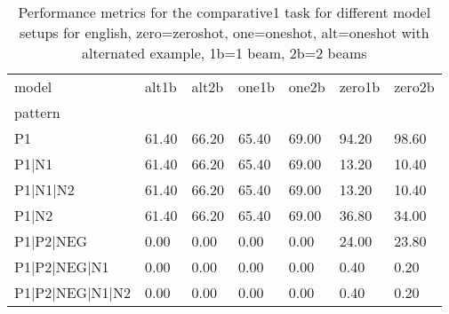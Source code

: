 \begin{table}[h]
\begin{tabular}{l|llllll}
\toprule
model & alt1b & alt2b & one1b & one2b & zero1b & zero2b \\
pattern &  &  &  &  &  &  \\
\midrule
P1 & 61.40 & 66.20 & 65.40 & 69.00 & 94.20 & 98.60 \\
P1|N1 & 61.40 & 66.20 & 65.40 & 69.00 & 13.20 & 10.40 \\
P1|N1|N2 & 61.40 & 66.20 & 65.40 & 69.00 & 13.20 & 10.40 \\
P1|N2 & 61.40 & 66.20 & 65.40 & 69.00 & 36.80 & 34.00 \\
P1|P2|NEG & 0.00 & 0.00 & 0.00 & 0.00 & 24.00 & 23.80 \\
P1|P2|NEG|N1 & 0.00 & 0.00 & 0.00 & 0.00 & 0.40 & 0.20 \\
P1|P2|NEG|N1|N2 & 0.00 & 0.00 & 0.00 & 0.00 & 0.40 & 0.20 \\
\bottomrule
\end{tabular}
\caption{Performance metrics for the comparative1 task for different model setups for english, zero=zeroshot, one=oneshot, alt=oneshot with alternated example, 1b=1 beam, 2b=2 beams}
\label{tab:en_comparative1_performance}
\end{table}
